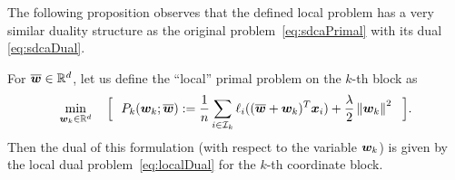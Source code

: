 \documentclass{article} %
\begin{document}



The following proposition observes that the defined local problem has a very similar duality structure as the original problem~\eqref{eq:sdcaPrimal} with its dual \eqref{eq:sdcaDual}.
\begin{proposition}
For $\overline{{\bm{w}}}\in\mathbb{R}^d$, let us define the ``local'' primal problem on the $k$-th block as
\begin{equation}\label{eq:localPrimal}
\min_{{\bm{w}}_k \in\mathbb{R}^d} \quad \Big[ \ \ P_k({\bm{w}}_k;\overline{{\bm{w}}}) := \frac1{n} 
                       \sum_{i\in\mathcal{I}_k}
                       \ell_i( (\overline{{\bm{w}}}+{\bm{w}}_k)^T \bm{x}_i )  
                       + \frac{\lambda}{2}\left\lVert{\bm{w}}_k\right\rVert^2
                       \ \ \Big] .
\end{equation}
Then the dual of this formulation (with respect to the variable ${\bm{w}}_k$) is given by the local dual problem~\eqref{eq:localDual} for the $k$-th coordinate block.
\end{proposition}
\end{document}
